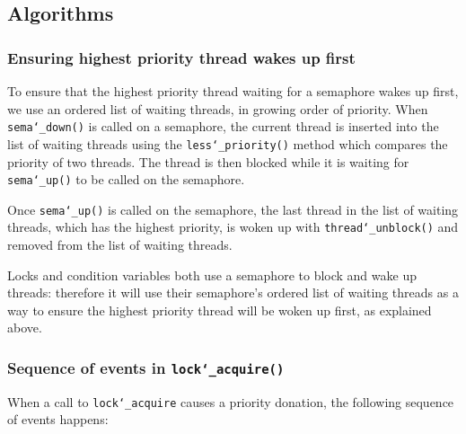 \documentclass{article}
\renewcommand{\_}{\char`_}
\begin{document}
\subsection{Algorithms}
\subsubsection{Ensuring highest priority thread wakes up first}

To ensure that the highest priority thread waiting for a semaphore wakes up first, we use an ordered list of waiting threads,
in growing order of priority. When \texttt{sema\_down()} is called on a semaphore, the current thread is inserted into the list of waiting threads using the \texttt{less\_priority()} method which compares the priority of two threads. The thread is then blocked while it is waiting for \texttt{sema\_up()} to be called on the semaphore.

Once \texttt{sema\_up()} is called on the semaphore, the last thread in the list of waiting threads, which has the highest priority,
is woken up with \texttt{thread\_unblock()} and removed from the list of waiting threads.

Locks and condition variables both use a semaphore to block and wake up threads: therefore it will use their semaphore's 
ordered list of waiting threads as a way to ensure the highest priority thread will be woken up first, as explained above.

\subsubsection{Sequence of events in \texttt{lock\_acquire()}}

When a call to \texttt{lock\_acquire} causes a priority donation, the following sequence of events happens:
\end{document}
